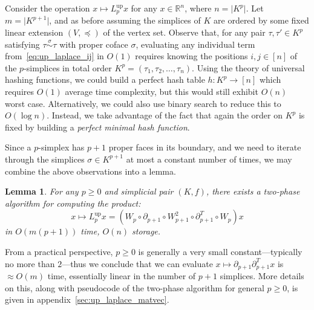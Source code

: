\documentclass[10pt]{article}
\numberwithin{equation}{section}
\newcommand{\+}{%
	\raisebox{0.18ex}{\scaleobj{0.55}{+}}
}
\newtheorem{lemma}{Lemma}
\theoremstyle{definition}
\begin{document}
Consider the operation $x \mapsto L_p^{\text{up}} x$ for any $x \in \mathbb{R}^n$, where $n = \lvert K^p \rvert$. Let $m = \lvert K^{p+1}\rvert$, and as before assuming the simplices of $K$ are ordered by some fixed linear extension $(V, \preceq)$ of the vertex set.
Observe that, for any pair $\tau, \tau' \in K^p$ satisfying $\tau \overset{\sigma}{\sim} \tau$ with proper coface $\sigma$, evaluating any individual term from~\eqref{eq:up_laplace_ij} in $O(1)$ requires knowing the positions $i,j \in [n]$ of the $p$-simplices in total order $K^p = (\tau_1, \tau_2, \dots, \tau_n)$. Using the theory of universal hashing functions, we could build a perfect hash table $h : K^p \to [n]$ which requires $O(1)$ average time complexity, but this would still exhibit $O(n)$ worst case. Alternatively, we could also use binary search to reduce this to $O(\log n)$. Instead, we take advantage of the fact that again the order on $K^p$ is fixed by building a \emph{perfect minimal hash function}. 

Since a $p$-simplex has $p+1$ proper faces in its boundary, and we need to iterate through the simplices $\sigma \in K^{p+1}$ at most a constant number of times, we may combine the above observations into a lemma. 
\begin{lemma}
	For any $p \geq 0$ and simplicial pair $(K, f)$, there exists a two-phase algorithm for computing the product: 
	\begin{equation}
		x \mapsto L_p^{\text{up}} x = (W_p \circ \partial_{p+1} \circ W_{p+1}^2 \circ \partial_{p+1}^T \circ W_p)x
	\end{equation}
	in $O(m(p+1))$ time, $O(n)$ storage. 
\end{lemma}
\noindent From a practical perspective, $p \geq 0$ is generally a very small constant---typically no more than $2$---thus we conclude that we can evaluate $x \mapsto \partial_{p+1} \partial_{p+1}^T x$ is $\approx O(m)$ time, essentially linear in the number of $p+1$ simplices. 
More details on this, along with pseudocode of the two-phase algorithm for general $p \geq 0$, is given in appendix~\ref{sec:up_laplace_matvec}.


  
\end{document}
